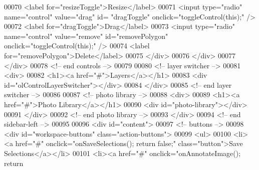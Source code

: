\begin{DoxyCode}
00070                             <label \textcolor{keywordflow}{for}=\textcolor{stringliteral}{"resizeToggle"}>Resize</label>
00071                             <input type=\textcolor{stringliteral}{"radio"} name=\textcolor{stringliteral}{"control"} value=\textcolor{stringliteral}{"drag"} \textcolor{keywordtype}{id}=\textcolor{stringliteral}{
      "dragToggle"} onclick=\textcolor{stringliteral}{"toggleControl(this);"} />
00072                             <label \textcolor{keywordflow}{for}=\textcolor{stringliteral}{"dragToggle"}>Drag</label>
00073                             <input type=\textcolor{stringliteral}{"radio"} name=\textcolor{stringliteral}{"control"} value=\textcolor{stringliteral}{"remove"} \textcolor{keywordtype}{
      id}=\textcolor{stringliteral}{"removePolygon"} onclick=\textcolor{stringliteral}{"toggleControl(this);"} />
00074                             <label \textcolor{keywordflow}{for}=\textcolor{stringliteral}{"removePolygon"}>Delete</label>
00075                         </div>
00076                     </div>
00077                 </div>
00078                 <!-- end controls -->
00079 
00080                 <!-- layer switcher -->
00081                 <div>
00082                     <h1><a href=\textcolor{stringliteral}{"#"}>Layers</a></h1>
00083                     <div \textcolor{keywordtype}{id}=\textcolor{stringliteral}{"olControlLayerSwitcher"}></div>
00084                 </div>
00085                 <!-- end layer switcher -->
00086 
00087                 <!-- photo library -->
00088                 <div>
00089                     <h1><a href=\textcolor{stringliteral}{"#"}>Photo Library</a></h1>
00090                     <div \textcolor{keywordtype}{id}=\textcolor{stringliteral}{"photo-library"}></div>
00091                 </div>
00092                 <!-- end photo library -->
00093             </div>
00094             <!-- end sidebar-left -->
00095 
00096             <div \textcolor{keywordtype}{id}=\textcolor{stringliteral}{"content"}>
00097                 <!-- buttons -->
00098                 <div \textcolor{keywordtype}{id}=\textcolor{stringliteral}{"workspace-buttons"} \textcolor{keyword}{class}=\textcolor{stringliteral}{"action-buttons"}>
00099                     <ul>
00100                         <li><a href=\textcolor{stringliteral}{"#"} onclick=\textcolor{stringliteral}{"onSaveSelections(); return
       false;"} \textcolor{keyword}{class}=\textcolor{stringliteral}{"button"}>Save Selections</a></li>
00101                         <li><a href=\textcolor{stringliteral}{"#"} onclick=\textcolor{stringliteral}{"onAnnotateImage(); return
}
\end{DoxyCode}
